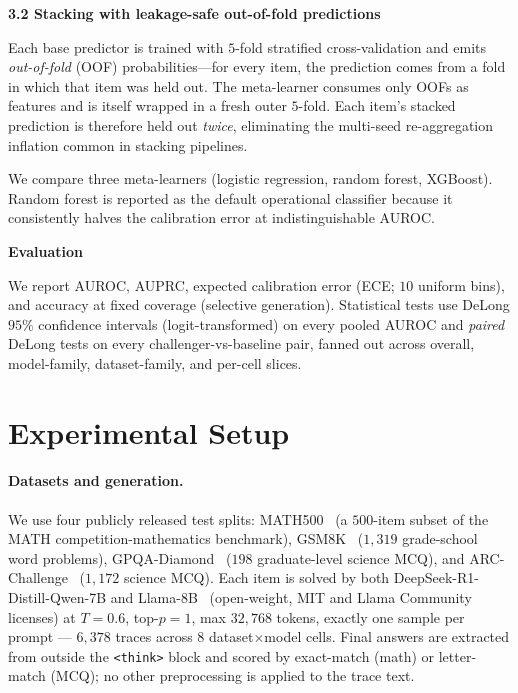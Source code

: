 \documentclass{article}
\begin{document}
\textbf{3.2 Stacking with leakage-safe out-of-fold predictions}

Each base predictor is trained with $5$-fold stratified cross-validation and
emits \emph{out-of-fold} (OOF) probabilities---for every item, the prediction
comes from a fold in which that item was held out. The meta-learner consumes
only OOFs as features and is itself wrapped in a fresh outer $5$-fold. Each
item's stacked prediction is therefore held out \emph{twice}, eliminating the
multi-seed re-aggregation inflation common in stacking pipelines.

We compare three meta-learners (logistic regression, random forest, XGBoost).
Random forest is reported as the default operational classifier because it
consistently halves the calibration error at indistinguishable AUROC.

\textbf{Evaluation}

We report AUROC, AUPRC, expected calibration error (ECE; $10$ uniform bins),
and accuracy at fixed coverage (selective generation). Statistical tests use
DeLong $95\%$ confidence intervals (logit-transformed) on every pooled AUROC
and \emph{paired} DeLong tests on every challenger-vs-baseline pair, fanned
out across overall, model-family, dataset-family, and per-cell slices.

\section{Experimental Setup}

\paragraph{Datasets and generation.} We use four publicly released test
splits: MATH500~\cite{hendrycks2021math} (a $500$-item subset of the MATH
competition-mathematics benchmark), GSM8K~\cite{cobbe2021gsm8k} ($1{,}319$
grade-school word problems), GPQA-Diamond~\cite{rein2023gpqa} ($198$
graduate-level science MCQ), and ARC-Challenge~\cite{clark2018arc}
($1{,}172$ science MCQ). Each item is solved by both
DeepSeek-R1-Distill-Qwen-7B and Llama-8B~\cite{deepseekr1} (open-weight, MIT
and Llama Community licenses) at $T = 0.6$, top-$p\!=\!1$, max $32{,}768$
tokens, exactly one sample per prompt --- $6{,}378$ traces across $8$
dataset$\times$model cells. Final answers are extracted from outside the
\texttt{<think>} block and scored by exact-match (math) or letter-match
(MCQ); no other preprocessing is applied to the trace text.
\end{document}
